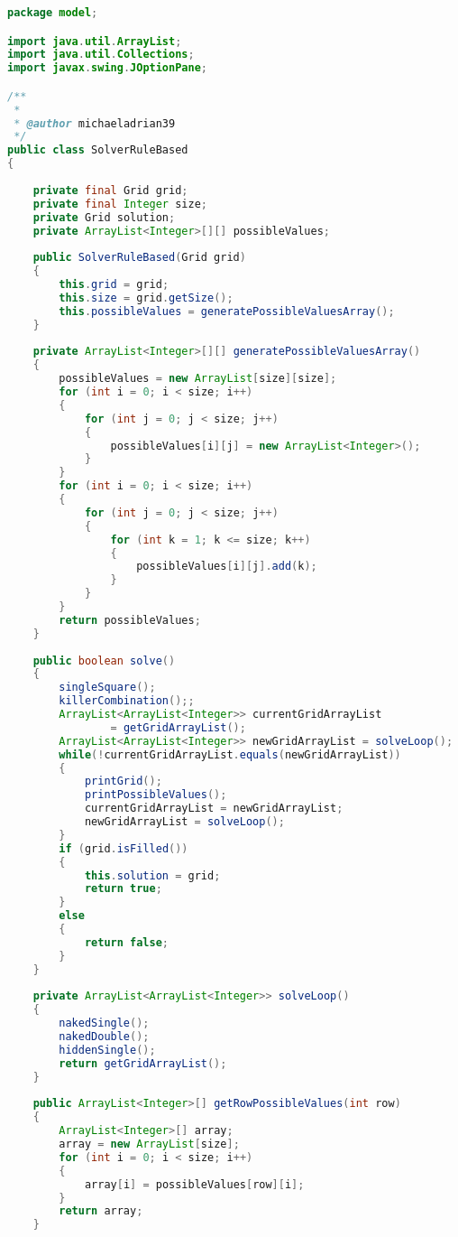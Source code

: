\begin{lstlisting}[language=Java,basicstyle=\tiny,caption=SolverRuleBased.java]
package model;

import java.util.ArrayList;
import java.util.Collections;
import javax.swing.JOptionPane;

/**
 *
 * @author michaeladrian39
 */
public class SolverRuleBased
{
    
    private final Grid grid;
    private final Integer size;
    private Grid solution;
    private ArrayList<Integer>[][] possibleValues;
    
    public SolverRuleBased(Grid grid)
    {
        this.grid = grid;
        this.size = grid.getSize();
        this.possibleValues = generatePossibleValuesArray();
    }
    
    private ArrayList<Integer>[][] generatePossibleValuesArray()
    {
        possibleValues = new ArrayList[size][size];
        for (int i = 0; i < size; i++)
        {
            for (int j = 0; j < size; j++)
            {
                possibleValues[i][j] = new ArrayList<Integer>();
            }
        }
        for (int i = 0; i < size; i++)
        {
            for (int j = 0; j < size; j++)
            {
                for (int k = 1; k <= size; k++)
                {
                    possibleValues[i][j].add(k);
                }
            }
        }
        return possibleValues;
    }
    
    public boolean solve()
    {
        singleSquare();
        killerCombination();;
        ArrayList<ArrayList<Integer>> currentGridArrayList 
                = getGridArrayList();
        ArrayList<ArrayList<Integer>> newGridArrayList = solveLoop();
        while(!currentGridArrayList.equals(newGridArrayList))
        {
            printGrid();
            printPossibleValues();
            currentGridArrayList = newGridArrayList;
            newGridArrayList = solveLoop();
        }
        if (grid.isFilled())
        {
            this.solution = grid;
            return true;
        }
        else
        {
            return false;
        }
    }
    
    private ArrayList<ArrayList<Integer>> solveLoop()
    {
        nakedSingle();
        nakedDouble();
        hiddenSingle();
        return getGridArrayList();
    }
    
    public ArrayList<Integer>[] getRowPossibleValues(int row)
    {
        ArrayList<Integer>[] array;
        array = new ArrayList[size];
        for (int i = 0; i < size; i++)
        {
            array[i] = possibleValues[row][i];
        }
        return array;
    }
    

\end{lstlisting}
